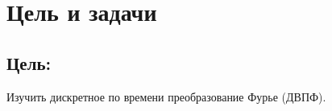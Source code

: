 \chapter*{Цель и задачи}
\label{ch:intro}

\section*{\textbf{Цель:}}

Изучить дискретное по времени преобразование Фурье (ДВПФ).

\endinput